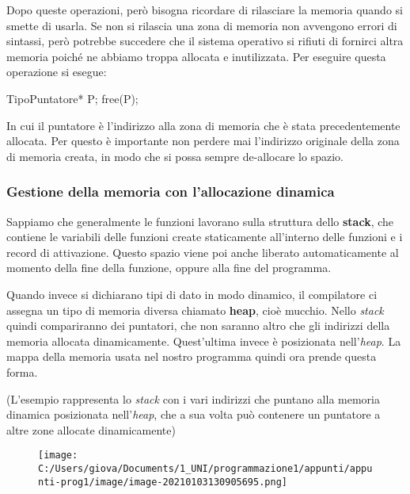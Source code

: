 \documentclass[
]{article}
\newenvironment{Shaded}{}{}
\newcommand{\NormalTok}[1]{#1}
\begin{document}
Dopo queste operazioni, però bisogna ricordare di rilasciare la memoria
quando si smette di usarla. Se non si rilascia una zona di memoria non
avvengono errori di sintassi, però potrebbe succedere che il sistema
operativo si rifiuti di fornirci altra memoria poiché ne abbiamo troppa
allocata e inutilizzata. Per eseguire questa operazione si esegue:

\begin{Shaded}
\begin{Highlighting}[]
\NormalTok{TipoPuntatore* P;}
\NormalTok{free(P);}
\end{Highlighting}
\end{Shaded}

In cui il puntatore è l'indirizzo alla zona di memoria che è stata
precedentemente allocata. Per questo è importante non perdere mai
l'indirizzo originale della zona di memoria creata, in modo che si possa
sempre de-allocare lo spazio.

\hypertarget{header-n1118}{%
\subsubsection{Gestione della memoria con l'allocazione
dinamica}\label{header-n1118}}

Sappiamo che generalmente le funzioni lavorano sulla struttura dello
\textbf{stack}, che contiene le variabili delle funzioni create
staticamente all'interno delle funzioni e i record di attivazione.
Questo spazio viene poi anche liberato automaticamente al momento della
fine della funzione, oppure alla fine del programma.

Quando invece si dichiarano tipi di dato in modo dinamico, il
compilatore ci assegna un tipo di memoria diversa chiamato
\textbf{heap}, cioè mucchio. Nello \emph{stack} quindi compariranno dei
puntatori, che non saranno altro che gli indirizzi della memoria
allocata dinamicamente. Quest'ultima invece è posizionata
nell'\emph{heap}. La mappa della memoria usata nel nostro programma
quindi ora prende questa forma.

(L'esempio rappresenta lo \emph{stack} con i vari indirizzi che puntano
alla memoria dinamica posizionata nell'\emph{heap}, che a sua volta può
contenere un puntatore a altre zone allocate dinamicamente)

\begin{figure}
\centering
\texttt{[image: C:/Users/giova/Documents/1\_UNI/programmazione1/appunti/appunti-prog1/image/image-20210103130905695.png]}
\caption{}
\end{figure}
\end{document}
